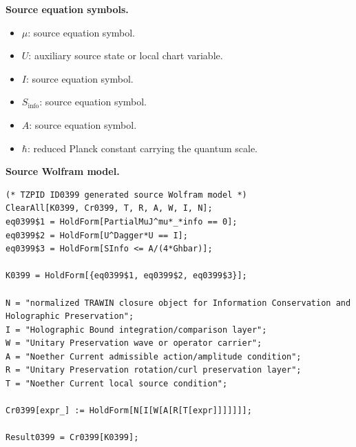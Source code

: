 \begin{minipage}[t]{0.49\linewidth}
\begingroup
\small
\raggedright
\textbf{Source equation symbols.}\par
\begin{itemize}[leftmargin=1.35em,itemsep=1pt,topsep=1pt,parsep=0pt]
    \item $\mu$: source equation symbol.
    \item $U$: auxiliary source state or local chart variable.
    \item $I$: source equation symbol.
    \item $S_{\mathrm{info}}$: source equation symbol.
    \item $A$: source equation symbol.
    \item $\hbar$: reduced Planck constant carrying the quantum scale.
\end{itemize}
\endgroup
\end{minipage}\hfill
\begin{minipage}[t]{0.47\linewidth}
\begingroup
\scriptsize
\raggedright
\textbf{Source Wolfram model.}\par
\begin{Verbatim}[fontsize=\tiny,breaklines=true,breakanywhere=true]
(* TZPID ID0399 generated source Wolfram model *)
ClearAll[K0399, Cr0399, T, R, A, W, I, N];
eq0399$1 = HoldForm[PartialMuJ^mu*_*info == 0];
eq0399$2 = HoldForm[U^Dagger*U == I];
eq0399$3 = HoldForm[SInfo <= A/(4*Ghbar)];

K0399 = HoldForm[{eq0399$1, eq0399$2, eq0399$3}];

N = "normalized TRAWIN closure object for Information Conservation and Holographic Preservation";
I = "Holographic Bound integration/comparison layer";
W = "Unitary Preservation wave or operator carrier";
A = "Noether Current admissible action/amplitude condition";
R = "Unitary Preservation rotation/curl preservation layer";
T = "Noether Current local source condition";

Cr0399[expr_] := HoldForm[N[I[W[A[R[T[expr]]]]]]];

Result0399 = Cr0399[K0399];
\end{Verbatim}
\endgroup
\end{minipage}

